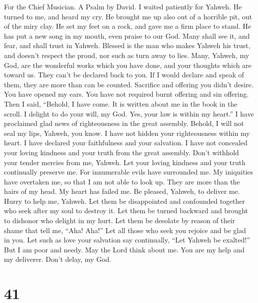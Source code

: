 For the Chief Musician. A Psalm by David.  I waited
patiently for Yahweh. He turned to me, and heard my cry. 
He brought me up also out of a horrible pit, out of the miry clay. He
set my feet on a rock, and gave me a firm place to stand. 
He has put a new song in my mouth, even praise to our God. Many shall
see it, and fear, and shall trust in Yahweh.  Blessed is
the man who makes Yahweh his trust, and doesn't respect the proud, nor
such as turn away to lies.  Many, Yahweh, my God, are the
wonderful works which you have done, and your thoughts which are toward
us. They can't be declared back to you. If I would declare and speak of
them, they are more than can be counted.  Sacrifice and
offering you didn't desire. You have opened my ears. You have not
required burnt offering and sin offering.  Then I said,
``Behold, I have come. It is written about me in the book in the scroll.
 I delight to do your will, my God. Yes, your law is
within my heart.''  I have proclaimed glad news of
righteousness in the great assembly. Behold, I will not seal my lips,
Yahweh, you know.  I have not hidden your righteousness
within my heart. I have declared your faithfulness and your salvation. I
have not concealed your loving kindness and your truth from the great
assembly.  Don't withhold your tender mercies from me,
Yahweh. Let your loving kindness and your truth continually preserve me.
 For innumerable evils have surrounded me. My iniquities
have overtaken me, so that I am not able to look up. They are more than
the hairs of my head. My heart has failed me.  Be
pleased, Yahweh, to deliver me. Hurry to help me, Yahweh.
 Let them be disappointed and confounded together who
seek after my soul to destroy it. Let them be turned backward and
brought to dishonor who delight in my hurt.  Let them be
desolate by reason of their shame that tell me, ``Aha! Aha!''
 Let all those who seek you rejoice and be glad in you.
Let such as love your salvation say continually, ``Let Yahweh be
exalted!''  But I am poor and needy. May the Lord think
about me. You are my help and my deliverer. Don't delay, my God.

\hypertarget{section-40}{%
\section{41}\label{section-40}}

